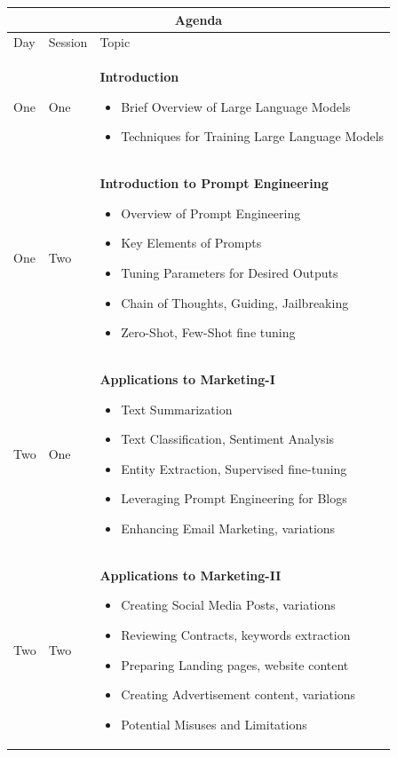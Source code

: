 \documentclass[a4paper, 11pt]{article}
\begin{document}
\begin{center} 
\begin{tabular}{ |p{1cm}|p{1cm}||p{10cm}|  }
 \hline
 \multicolumn{3}{|c|}{\textbf{\large Agenda}} \\
 \hline
Day & Session & Topic\\
 \hline
 One   &  One    &  \textbf{Introduction}
\begin{itemize}[itemsep=0pt]
\item Brief Overview of Large Language Models
\item Techniques for Training Large Language Models
\end{itemize} 
\\
One &   Two  &   \textbf{Introduction to Prompt Engineering}
 \begin{itemize}[itemsep=0pt]
\item Overview of Prompt Engineering
\item Key Elements of Prompts
\item Tuning Parameters for Desired Outputs
\item Chain of Thoughts, Guiding, Jailbreaking
\item Zero-Shot, Few-Shot fine tuning
\end{itemize} 
\\
Two   &  One    & \textbf{Applications to Marketing-I}
 \begin{itemize}[itemsep=0pt]
\item Text Summarization
\item Text Classification, Sentiment Analysis
\item Entity Extraction, Supervised fine-tuning
\item Leveraging Prompt Engineering for Blogs
\item Enhancing Email Marketing, variations
\end{itemize} 
\\
Two  &   Two  & \textbf{Applications to Marketing-II}
 \begin{itemize}[itemsep=0pt]
 \item Creating Social Media Posts, variations
\item Reviewing Contracts, keywords extraction
\item Preparing Landing pages, website content
\item Creating Advertisement content, variations
\item Potential Misuses and Limitations 
\end{itemize} 
\\
 \hline
\end{tabular}
\end{center}
\end{document}
